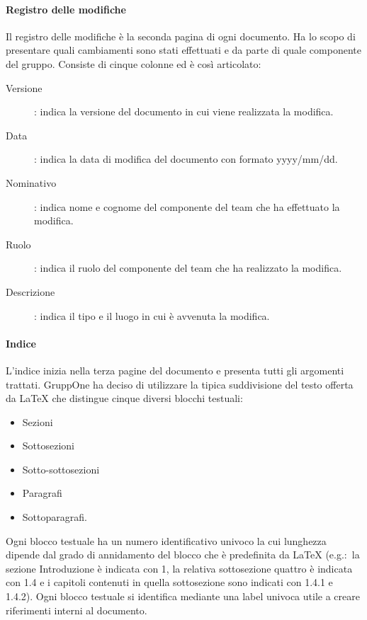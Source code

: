 \documentclass[../norme-di-progetto.tex]{subfiles}
\begin{document}
\paragraph{Registro delle modifiche}%
\label{par:registro_delle_modifiche}
Il registro delle modifiche è la seconda pagina di ogni documento. Ha lo scopo di presentare quali cambiamenti sono stati effettuati e da parte di quale componente del gruppo. Consiste di cinque colonne ed è così articolato:
\begin{description}
  \item [Versione]: indica la versione del documento in cui viene realizzata la modifica.
  \item [Data]: indica la data di modifica del documento con formato yyyy/mm/dd.
  \item [Nominativo]: indica nome e cognome del componente del team che ha effettuato la modifica.
  \item [Ruolo]: indica il ruolo del componente del team che ha realizzato la modifica.
  \item [Descrizione]: indica il tipo e il luogo in cui è avvenuta la modifica.
\end{description}

\paragraph{Indice}%
\label{par:indice}
L'indice inizia nella terza pagine del documento e presenta tutti gli argomenti trattati.
GruppOne ha deciso di utilizzare la tipica suddivisione del testo offerta da \LaTeX{} che distingue cinque diversi blocchi testuali:
\begin{itemize}
  \item Sezioni
  \item Sottosezioni
  \item Sotto-sottosezioni
  \item Paragrafi
  \item Sottoparagrafi.
\end{itemize}

Ogni blocco testuale ha un numero identificativo univoco la cui lunghezza dipende dal grado di annidamento del blocco che è predefinita da \LaTeX{} (e.g.:\ la sezione Introduzione è indicata con 1, la relativa sottosezione quattro è indicata con 1.4 e i capitoli contenuti in quella sottosezione sono indicati con 1.4.1 e 1.4.2).
Ogni blocco testuale si identifica mediante una label univoca utile a creare riferimenti interni al documento. 
\end{document}
